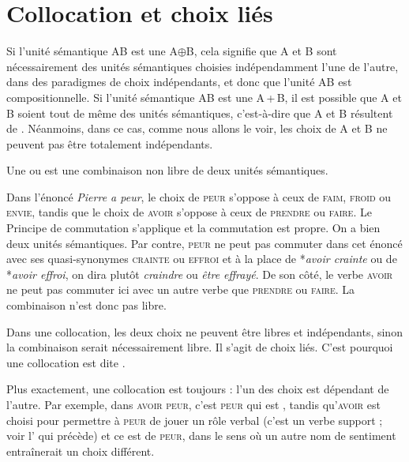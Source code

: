 \section{Collocation et choix liés}\label{sec:2.3.10}%

Si l’unité sémantique AB est une  A${\oplus}$B, cela signifie que A et B sont nécessairement des unités sémantiques choisies indépendamment l’une de l’autre, dans des paradigmes de choix indépendants, et donc que l’unité AB est compositionnelle. Si l’unité sémantique AB est une  A\,+\,B, il est possible que A et B soient tout de même des unités sémantiques, c’est-à-dire que A et B résultent de . Néanmoins, dans ce cas, comme nous allons le voir, les choix de A et B ne peuvent pas être totalement indépendants.

{Une  ou  est une combinaison non libre de deux unités sémantiques.}

Dans l’énoncé \textit{Pierre a peur}, le choix de \textsc{peur} s’oppose à ceux de \textsc{faim,} \textsc{froid} ou \textsc{envie}, tandis que le choix de \textsc{avoir} s’oppose à ceux de \textsc{prendre} ou \textsc{faire}. Le Principe de commutation s’applique et la commutation est propre. On a bien deux unités sémantiques. Par contre, \textsc{peur} ne peut pas commuter dans cet énoncé avec ses quasi-synonymes \textsc{crainte} ou \textsc{effroi} et à la place de *\textit{avoir crainte} ou de *\textit{avoir effroi}, on dira plutôt \textit{craindre} ou \textit{être effrayé}. De son côté, le verbe \textsc{avoir} ne peut pas commuter ici avec un autre verbe que \textsc{prendre} ou \textsc{faire}. La combinaison n’est donc pas libre.

{Dans une collocation, les deux choix ne peuvent être libres et indépendants, sinon la combinaison serait nécessairement libre. Il s’agit de choix liés. C’est pourquoi une collocation est dite .}

Plus exactement, une collocation est toujours : l’un des choix est dépendant de l’autre. Par exemple, dans \textsc{avoir} \textsc{peur}, c’est \textsc{peur} qui est , tandis qu’\textsc{avoir} est choisi pour permettre à \textsc{peur} de jouer un rôle verbal (c’est un verbe support ; voir l’ qui précède) et ce  est  de \textsc{peur}, dans le sens où un autre nom de sentiment entraînerait un choix différent.

